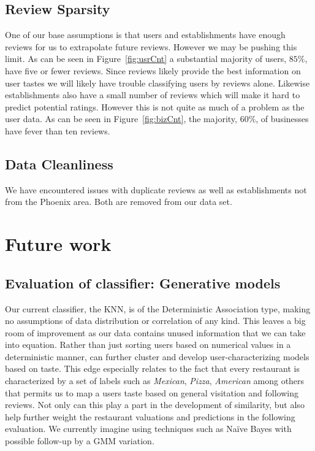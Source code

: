 \documentclass[10pt,twocolumn,letterpaper]{article}
\begin{document}
\subsection{Review Sparsity}
One of our base assumptions is that users and establishments have enough reviews for us to extrapolate future reviews. However we may be pushing this limit. As can be seen in Figure~\ref{fig:usrCnt} a substantial majority of users, $85\%$, have five or fewer reviews. Since reviews likely provide the best information on user tastes we will likely have trouble classifying users by reviews alone. Likewise establishments also have a small number of reviews which will make it hard to predict potential ratings. However this is not quite as much of a problem as the user data. As can be seen in Figure~\ref{fig:bizCnt}, the majority, $60\%$, of businesses have fever than ten reviews.

\subsection{Data Cleanliness}
We have encountered issues with duplicate reviews as well as establishments not from the Phoenix area. Both are removed from our data set.


\section{Future work}

\subsection{Evaluation of classifier: Generative models}
Our current classifier, the KNN, is of the Deterministic Association type, making no assumptions of data distribution or correlation of any kind. This leaves a big room of improvement as our data contains unused information that we can take into equation. Rather than just sorting users based on numerical values in a deterministic manner, can further cluster and develop user-characterizing models based on taste. This edge especially relates to the fact that every restaurant is characterized by a set of labels such as \textit{Mexican}, \textit{Pizza}, \textit{American} among others that permits us to map a users taste based on general visitation and following reviews. Not only can this play a part in the development of similarity, but also help further weight the restaurant valuations and predictions in the following evaluation. We currently imagine using techniques such as Naïve Bayes with possible follow-up by a GMM variation.
\end{document}
